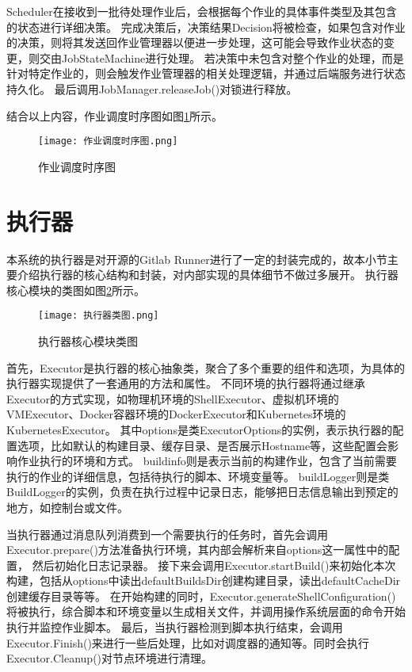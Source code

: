 Scheduler在接收到一批待处理作业后，会根据每个作业的具体事件类型及其包含的状态进行详细决策。
完成决策后，决策结果Decision将被检查，如果包含对作业的决策，则将其发送回作业管理器以便进一步处理，这可能会导致作业状态的变更，则交由JobStateMachine进行处理。
若决策中未包含对整个作业的处理，而是针对特定作业的，则会触发作业管理器的相关处理逻辑，并通过后端服务进行状态持久化。
最后调用JobManager.releaseJob()对锁进行释放。

结合以上内容，作业调度时序图如图\ref{fig:作业调度时序图}所示。

\begin{figure}[h]
  \centering
  \texttt{[image: 作业调度时序图.png]}
  \caption{作业调度时序图}
  \label{fig:作业调度时序图}
\end{figure}

\section{执行器}

本系统的执行器是对开源的Gitlab Runner进行了一定的封装完成的，故本小节主要介绍执行器的核心结构和封装，对内部实现的具体细节不做过多展开。
执行器核心模块的类图如图\ref{fig:执行器核心模块类图}所示。

\begin{figure}[h]
  \centering
  \texttt{[image: 执行器类图.png]}
  \caption{执行器核心模块类图}
  \label{fig:执行器核心模块类图}
\end{figure}

首先，Executor是执行器的核心抽象类，聚合了多个重要的组件和选项，为具体的执行器实现提供了一套通用的方法和属性。
不同环境的执行器将通过继承Executor的方式实现，如物理机环境的ShellExecutor、虚拟机环境的VMExecutor、Docker容器环境的DockerExecutor和Kubernetes环境的KubernetesExecutor。
其中options是类ExecutorOptions的实例，表示执行器的配置选项，比如默认的构建目录、缓存目录、是否展示Hostname等，这些配置会影响作业执行的环境和方式。
buildinfo则是表示当前的构建作业，包含了当前需要执行的作业的详细信息，包括待执行的脚本、环境变量等。
buildLogger则是类BuildLogger的实例，负责在执行过程中记录日志，能够把日志信息输出到预定的地方，如控制台或文件。

当执行器通过消息队列消费到一个需要执行的任务时，首先会调用Executor.prepare()方法准备执行环境，其内部会解析来自options这一属性中的配置，
然后初始化日志记录器。
接下来会调用Executor.startBuild()来初始化本次构建，包括从options中读出defaultBuildsDir创建构建目录，读出defaultCacheDir创建缓存目录等等。
在开始构建的同时，Executor.generateShellConfiguration()将被执行，综合脚本和环境变量以生成相关文件，并调用操作系统层面的命令开始执行并监控作业脚本。
最后，当执行器检测到脚本执行结束，会调用Executor.Finish()来进行一些后处理，比如对调度器的通知等。同时会执行Executor.Cleanup()对节点环境进行清理。

